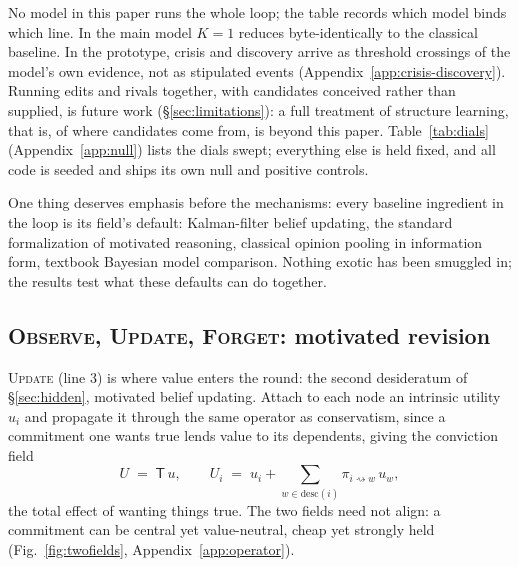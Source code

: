 \documentclass[runningheads]{llncs}
\newcommand{\desc}{\mathrm{desc}}
\newcommand{\rw}{\rightsquigarrow}
\newcommand{\Top}{\mathsf{T}}          %
\begin{document}
No model in this paper runs the whole loop; the table records which model binds which line.
In the main model
$K{=}1$ reduces byte-identically to the classical baseline. In the prototype, crisis and
discovery arrive as threshold crossings of the model's own evidence, not as stipulated
events (Appendix~\ref{app:crisis-discovery}). Running edits and rivals together, with
candidates conceived rather than supplied, is future work (\S\ref{sec:limitations}): a full
treatment of structure learning, that is, of where candidates come from, is beyond this paper.
Table~\ref{tab:dials} (Appendix~\ref{app:null}) lists the dials swept; everything else is
held fixed, and all code is seeded and ships its own null and positive controls.

One thing deserves emphasis before the mechanisms: every baseline ingredient in the loop is
its field's default: Kalman-filter belief updating, the standard formalization of motivated
reasoning, classical opinion pooling in information form, textbook Bayesian model comparison.
Nothing exotic has been smuggled in; the results test what these defaults can do
together.

\subsection{\textsc{Observe}, \textsc{Update}, \textsc{Forget}: motivated revision}
\label{sec:revision}

\textsc{Update} (line 3) is where value enters the round: the second desideratum of
\S\ref{sec:hidden}, motivated belief updating. Attach to each node an intrinsic utility $u_i$ and propagate it
through the same operator as conservatism, since a commitment one wants true lends value to
its dependents, giving the conviction field
\begin{equation}
U \;=\; \Top\,u,
\qquad
U_i \;=\; u_i+\!\!\sum_{w\in\desc(i)}\!\!\pi_{i\rw w}\,u_w ,
\label{eq:U}
\end{equation}
the total effect of wanting things true. The two fields need not align: a commitment can be
central yet value-neutral, cheap yet strongly held (Fig.~\ref{fig:twofields},
Appendix~\ref{app:operator}).
\end{document}
